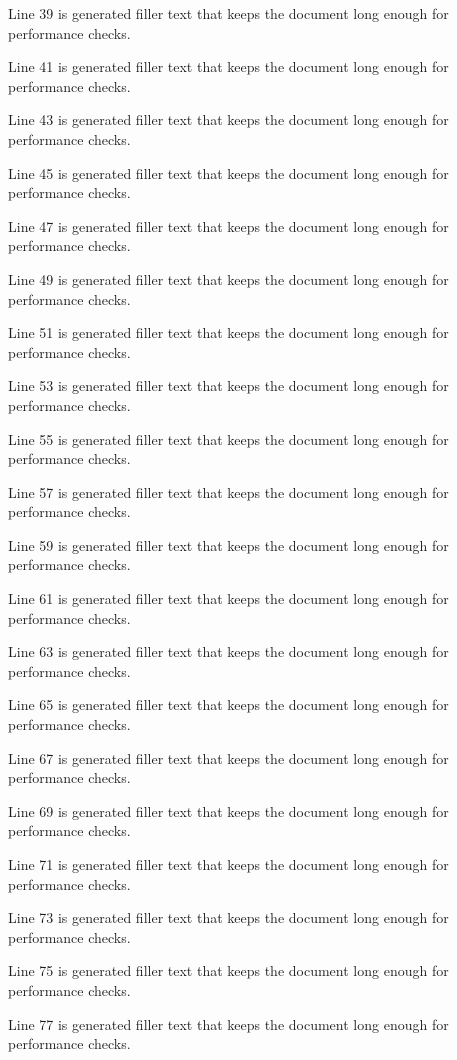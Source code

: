 Line 39 is generated filler text that keeps the document long enough for performance checks.

Line 41 is generated filler text that keeps the document long enough for performance checks.

Line 43 is generated filler text that keeps the document long enough for performance checks.

Line 45 is generated filler text that keeps the document long enough for performance checks.

Line 47 is generated filler text that keeps the document long enough for performance checks.

Line 49 is generated filler text that keeps the document long enough for performance checks.

Line 51 is generated filler text that keeps the document long enough for performance checks.

Line 53 is generated filler text that keeps the document long enough for performance checks.

Line 55 is generated filler text that keeps the document long enough for performance checks.

Line 57 is generated filler text that keeps the document long enough for performance checks.

Line 59 is generated filler text that keeps the document long enough for performance checks.

Line 61 is generated filler text that keeps the document long enough for performance checks.

Line 63 is generated filler text that keeps the document long enough for performance checks.

Line 65 is generated filler text that keeps the document long enough for performance checks.

Line 67 is generated filler text that keeps the document long enough for performance checks.

Line 69 is generated filler text that keeps the document long enough for performance checks.

Line 71 is generated filler text that keeps the document long enough for performance checks.

Line 73 is generated filler text that keeps the document long enough for performance checks.

Line 75 is generated filler text that keeps the document long enough for performance checks.

Line 77 is generated filler text that keeps the document long enough for performance checks.

